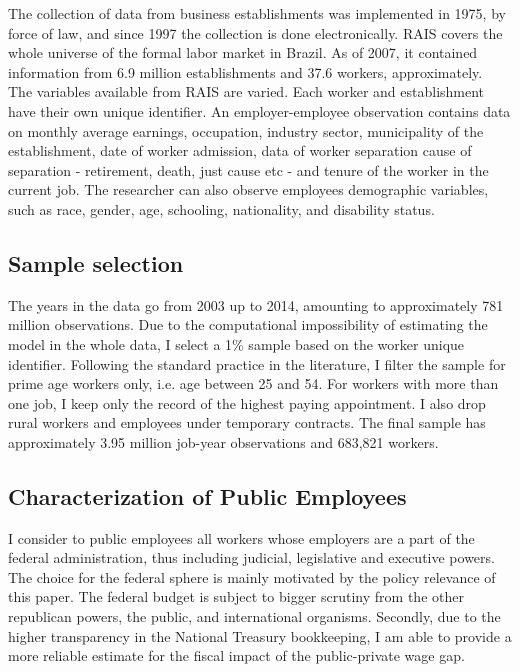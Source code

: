 \documentclass{article}
\begin{document}
\noindent
The collection of data from  business establishments was implemented in 1975, by force of law, and since 1997 the collection is done electronically. RAIS covers the whole universe of the formal labor market in Brazil. As of 2007, it contained information from 6.9 million establishments and 37.6 workers, approximately. \\

\noindent
The variables available from RAIS are varied. Each worker and establishment have their own unique identifier. An employer-employee observation contains data on monthly average earnings, occupation, industry sector, municipality of the establishment, date of worker admission, data of worker separation cause of separation - retirement, death, just cause etc - and tenure of the worker in the current job. The researcher can also observe employees demographic variables, such as race, gender, age, schooling, nationality, and disability status. \\

\subsection{Sample selection}
\noindent
The years in the data go from 2003 up to 2014, amounting to approximately 781 million observations. Due to the computational impossibility of estimating the model in the whole data, I select a 1\% sample based on the worker unique identifier. Following the standard practice in the literature, I filter the sample for prime age workers only, i.e. age between 25 and 54. For workers with more than one job, I keep only the record of the highest paying appointment. I also drop rural workers and employees under temporary contracts. The final sample has approximately 3.95 million job-year observations and 683,821 workers. \\

\subsection{Characterization of Public Employees}
\noindent
I consider to public employees all workers whose employers are a part of the federal administration, thus including judicial, legislative and executive powers. The choice for the federal sphere is mainly motivated by the policy relevance of this paper. The federal budget is subject to bigger scrutiny from the other republican powers, the public, and international organisms. Secondly, due to the higher transparency in the National Treasury bookkeeping, I am able to provide a more reliable estimate for the fiscal impact of the public-private wage gap.        
\end{document}

